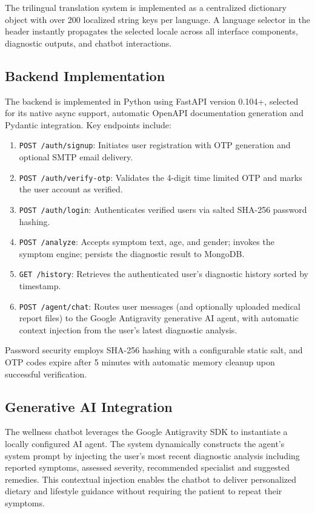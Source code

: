 \documentclass[conference]{IEEEtran}
\begin{document}
The trilingual translation system is implemented as a centralized dictionary object with over 200 localized string keys per language. A language selector in the header instantly propagates the selected locale across all interface components, diagnostic outputs, and chatbot interactions.

\subsection{Backend Implementation}

The backend is implemented in Python using FastAPI version 0.104+, selected for its native async support, automatic OpenAPI documentation generation and Pydantic integration. Key endpoints include:

\begin{enumerate}
\item \texttt{POST /auth/signup}: Initiates user registration with OTP generation and optional SMTP email delivery.
\item \texttt{POST /auth/verify-otp}: Validates the 4-digit time limited OTP and marks the user account as verified.
\item \texttt{POST /auth/login}: Authenticates verified users via salted SHA-256 password hashing.
\item \texttt{POST /analyze}: Accepts symptom text, age, and gender; invokes the symptom engine; persists the diagnostic result to MongoDB.
\item \texttt{GET /history}: Retrieves the authenticated user's diagnostic history sorted by timestamp.
\item \texttt{POST /agent/chat}: Routes user messages (and optionally uploaded medical report files) to the Google Antigravity generative AI agent, with automatic context injection from the user's latest diagnostic analysis.
\end{enumerate}

Password security employs SHA-256 hashing with a configurable static salt, and OTP codes expire after 5 minutes with automatic memory cleanup upon successful verification.

\subsection{Generative AI Integration}

The wellness chatbot leverages the Google Antigravity SDK to instantiate a locally configured AI agent. The system dynamically constructs the agent's system prompt by injecting the user's most recent diagnostic analysis including reported symptoms, assessed severity, recommended specialist and suggested remedies. This contextual injection enables the chatbot to deliver personalized dietary and lifestyle guidance without requiring the patient to repeat their symptoms.
\end{document}
